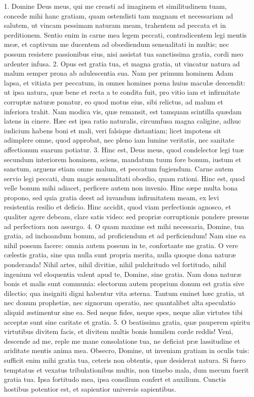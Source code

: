 \documentclass[twoside]{article}
\begin{document}
1. Domine Deus meus, qui me creasti ad imaginem et similitudinem tuam, concede mihi hanc gratiam, quam ostendisti tam magnam et necessariam ad salutem, ut vincam pessimam naturam meam, trahentem ad peccata et in perditionem. Sentio enim in carne mea legem peccati, contradicentem legi mentis meæ, et captivum me ducentem ad obœdiendum sensualitati in multis; nec possum resistere passionibus eius, nisi assistat tua sanctissima gratia, cordi meo ardenter infusa.
2. Opus est gratia tua, et magna gratia, ut vincatur natura ad malum semper prona ab adulescentia sua. Nam per primum hominem Adam lapsa, et vitiata per peccatum, in omnes homines pœna huius maculæ descendit: ut ipsa natura, quæ bene et recta a te condita fuit, pro vitio iam et infirmitate corruptæ naturæ ponatur, eo quod motus eius, sibi relictus, ad malum et inferiora trahit. Nam modica vis, quæ remansit, est tamquam scintilla quædam latens in cinere. Hæc est ipsa ratio naturalis, circumfusa magna caligine, adhuc iudicium habens boni et mali, veri falsique distantiam; licet impotens sit adimplere omne, quod approbat, nec pleno iam lumine veritatis, nec sanitate affectionum suarum potiatur.
3. Hinc est, Deus meus, quod condelector legi tuæ secundum interiorem hominem, sciens, mandatum tuum fore bonum, iustum et sanctum, arguens etiam omne malum, et peccatum fugiendum. Carne autem servio legi peccati, dum magis sensualitati obœdio, quam rationi. Hinc est, quod velle bonum mihi adiacet, perficere autem non invenio. Hinc sæpe multa bona propono, sed quia gratia deest ad iuvandum infirmitatem meam, ex levi resistentia resilio et deficio. Hinc accidit, quod viam perfectionis agnosco, et qualiter agere debeam, clare satis video: sed propriæ corruptionis pondere pressus ad perfectiora non assurgo.
4. O quam maxime est mihi necessaria, Domine, tua gratia, ad inchoandum bonum, ad proficiendum et ad perficiendum! Nam sine ea nihil possum facere: omnia autem possum in te, confortante me gratia. O vere cælestis gratia, sine qua nulla sunt propria merita, nulla quoque dona naturæ ponderanda! Nihil artes, nihil divitiæ, nihil pulchritudo vel fortitudo, nihil ingenium vel eloquentia valent apud te, Domine, sine gratia. Nam dona naturæ bonis et malis sunt communia: electorum autem proprium donum est gratia sive dilectio; qua insigniti digni habentur vita æterna. Tantum eminet hæc gratia, ut nec donum prophetiæ, nec signorum operatio, nec quantalibet alta speculatio aliquid æstimentur sine ea. Sed neque fides, neque spes, neque aliæ virtutes tibi acceptæ sunt sine caritate et gratia.
5. O beatissima gratia, quæ pauperem spiritu virtutibus divitem facis, et divitem multis bonis humilem corde reddis! Veni, descende ad me, reple me mane consolatione tua, ne deficiat præ lassitudine et ariditate mentis anima mea. Obsecro, Domine, ut inveniam gratiam in oculis tuis: sufficit enim mihi gratia tua, ceteris non obtentis, quæ desiderat natura. Si fuero temptatus et vexatus tribulationibus multis, non timebo mala, dum mecum fuerit gratia tua. Ipsa fortitudo mea, ipsa consilium confert et auxilium. Cunctis hostibus potentior est, et sapientior universis sapientibus.
\end{document}
